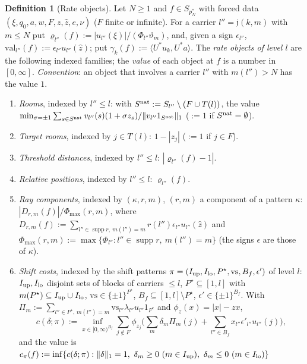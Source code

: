 \documentclass[10pt]{amsart}
\theoremstyle{definition}
\newtheorem{definition}[theorem]{Definition}
\theoremstyle{remark}
\newcommand{\supp}{\operatorname{supp}}
\newcommand{\zh}{\hat z}
\newcommand{\ip}[2]{\langle #1,#2\rangle}
\begin{document}
\begin{definition}[Rate objects]\label{def:II-rates}
Let $N\ge1$ and $f\in S_{p_N^*}$ with forced data
$(\xi,q_0,a,w,\allowbreak F,z,\zh,e,\nu)$ ($F$ finite or infinite).  For a carrier
$l''=\mathfrak j(k,m)$ with $m\le N$ put
$\varrho_{l''}(f):=|u_{l''}(\xi)|/(\Phi_{l''}\vartheta_m)$, and, given a sign
$\epsilon_{l''}$, $\mathrm{val}_{l''}(f):=\epsilon_{l''}u_{l''}(\zh)$;
put $\gamma_k(f):=\ip{U^*u_k}{U^*a}$.  The \emph{rate objects of level
$l$} are the following indexed families; the \emph{value} of each object
at $f$ is a number in $[0,\infty]$.  \emph{Convention}: an object that
involves a carrier $l''$ with $m(l'')>N$ has the value $1$.
\begin{enumerate}
\item[(O1)] \emph{Rooms}, indexed by $l''\le l$: with
$S^{\rm nat}:=S_{l''}\setminus(F\cup T(l))$, the value
$\min_{\sigma=\pm1}\sum_{s\in S^{\rm nat}}v_{l''}(s)(1+\sigma z_s)/
\|v_{l''}1_{S^{\rm nat}}\|_1$ ($:=1$ if $S^{\rm nat}=\emptyset$).
\item[(O2)] \emph{Target rooms}, indexed by $j\in T(l)$: $1-|z_j|$
($:=1$ if $j\in F$).
\item[(O3)] \emph{Threshold distances}, indexed by $l''\le l$:
$|\varrho_{l''}(f)-1|$.
\item[(O4)] \emph{Relative positions}, indexed by $l''\le l$:
$\varrho_{l''}(f)$.
\item[(O5)] \emph{Ray components}, indexed by $(\kappa,r,m)$, $(r,m)$ a
component of a pattern $\kappa$: $|D_{r,m}(f)|/\Phi_{\max}(r,m)$, where
$D_{r,m}(f):=\sum_{l''\in\supp r,\ m(l'')=m}r(l'')\epsilon_{l''}
u_{l''}(\zh)$ and $\Phi_{\max}(r,m):=\max\{\Phi_{l''}:l''\in\supp r,\
m(l'')=m\}$ (the signs $\epsilon$ are those of $\kappa$).
\item[(O6)] \emph{Shift costs}, indexed by the shift patterns
$\pi=(I_{\rm up},I_{\rm lo},P^\star,\mathrm{vs},B_f,\epsilon')$ of level
$l$: $I_{\rm up},I_{\rm lo}$ disjoint sets of blocks of carriers $\le l$,
$P^\star\subseteq[1,l]$ with $m(P^\star)\subseteq I_{\rm up}\cup I_{\rm
lo}$, $\mathrm{vs}\in\{\pm1\}^{P^\star}$, $B_f\subseteq[1,l]\setminus
P^\star$, $\epsilon'\in\{\pm1\}^{B_f}$.  With
$\Pi_m:=\sum_{l''\in P^\star,\,m(l'')=m}\mathrm{vs}_{l''}\lambda_{l''}
u_{l''}1_{F^c}$ and $\phi_z(x)=|x|-zx$,
\[
 c(\delta;\pi):=\inf_{x\in[0,\infty)^{B_f}}\sum_{j\notin F}\phi_{z_j}
 \Big(\sum_m\delta_m\Pi_m(j)+\sum_{l''\in B_f}x_{l''}\epsilon'_{l''}
 u_{l''}(j)\Big),
\]
and the value is $c_\pi(f):=\inf\{c(\delta;\pi):\|\delta\|_1=1,\
\delta_m\ge0\ (m\in I_{\rm up}),\ \delta_m\le0\ (m\in I_{\rm lo})\}$

\end{enumerate}
\end{definition}
\end{document}

